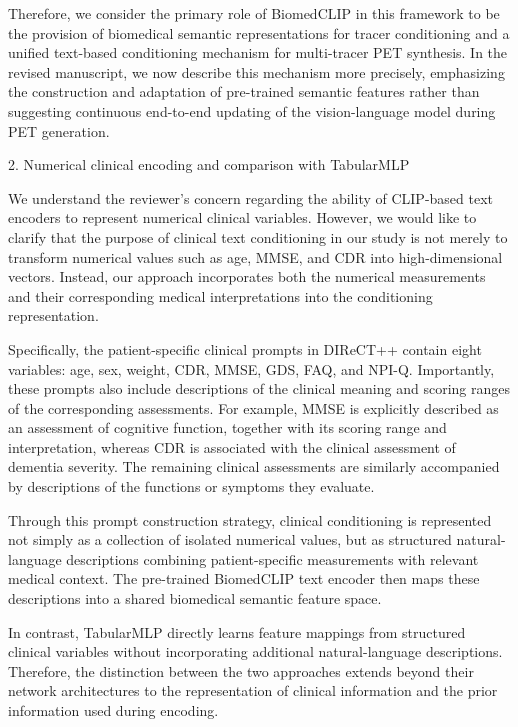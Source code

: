 {Therefore, we consider the primary role of BiomedCLIP in this framework to be the provision of biomedical semantic representations for tracer conditioning and a unified text-based conditioning mechanism for multi-tracer PET synthesis. In the revised manuscript, we now describe this mechanism more precisely, emphasizing the construction and adaptation of pre-trained semantic features rather than suggesting continuous end-to-end updating of the vision-language model during PET generation.

2. Numerical clinical encoding and comparison with TabularMLP

We understand the reviewer’s concern regarding the ability of CLIP-based text encoders to represent numerical clinical variables. However, we would like to clarify that the purpose of clinical text conditioning in our study is not merely to transform numerical values such as age, MMSE, and CDR into high-dimensional vectors. Instead, our approach incorporates both the numerical measurements and their corresponding medical interpretations into the conditioning representation.

Specifically, the patient-specific clinical prompts in DIReCT++ contain eight variables: age, sex, weight, CDR, MMSE, GDS, FAQ, and NPI-Q. Importantly, these prompts also include descriptions of the clinical meaning and scoring ranges of the corresponding assessments. For example, MMSE is explicitly described as an assessment of cognitive function, together with its scoring range and interpretation, whereas CDR is associated with the clinical assessment of dementia severity. The remaining clinical assessments are similarly accompanied by descriptions of the functions or symptoms they evaluate.

Through this prompt construction strategy, clinical conditioning is represented not simply as a collection of isolated numerical values, but as structured natural-language descriptions combining patient-specific measurements with relevant medical context. The pre-trained BiomedCLIP text encoder then maps these descriptions into a shared biomedical semantic feature space.

In contrast, TabularMLP directly learns feature mappings from structured clinical variables without incorporating additional natural-language descriptions. Therefore, the distinction between the two approaches extends beyond their network architectures to the representation of clinical information and the prior information used during encoding.

}

